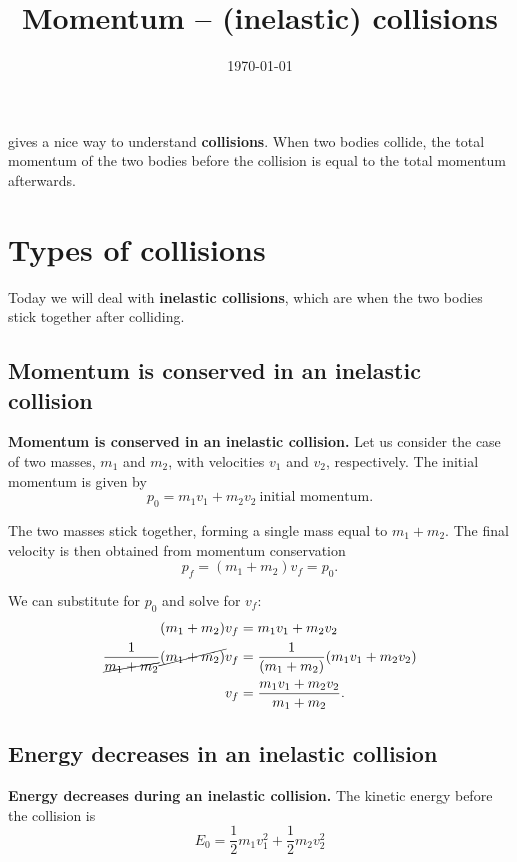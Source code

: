 \documentclass[handout]{tufte-handout}
\title{Momentum -- (inelastic) collisions}
\date{\today}
\author{\mobeardInstructorShort}
\begin{document}
\maketitle

 gives a nice way to understand \textbf{collisions}. When two bodies collide, the total momentum of the two bodies before the collision is equal to the total momentum afterwards. 

\section{Types of collisions}
Today we will deal with \textbf{inelastic collisions}, which are when the two bodies stick together after colliding. 

\subsection{Momentum is conserved in an inelastic collision}
\textbf{Momentum is conserved in an inelastic collision.} Let us consider the case of two masses, $m_1$ and $m_2$, with velocities $v_1$ and $v_2$, respectively. The initial momentum is given by 
\begin{equation}
p_0 = m_1 v_1 + m_2 v_2\ \text{initial momentum}.
\end{equation} 

The two masses stick together, forming a single mass equal to $m_1+m_2$. The final velocity is then obtained from momentum conservation
\begin{equation}
p_f = (m_1 + m_2) v_f = p_0.
\end{equation}
 
 We can substitute for $p_0$ and solve for $v_f$:
 \begin{align}
 (m_1 + m_2) v_f &= m_1 v_1 + m_2 v_2 \\
 \dfrac{1}{\cancel{m_1 + m_2}} \cancel{(m_1 + m_2)} v_f &= \dfrac{1}{(m_1 + m_2)} (m_1 v_1 + m_2 v_2) \\
 v_f &= \dfrac{m_1 v_1 + m_2 v_2}{m_1 + m_2} .
 \end{align}

\subsection{Energy decreases in an inelastic collision}
\textbf{Energy decreases during an inelastic collision.} The kinetic energy before the collision is 
\begin{equation}
E_0 = \frac{1}{2} m_1 v_1^2 + \frac{1}{2} m_2 v_2^2
\end{equation}
\end{document}
